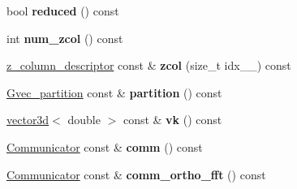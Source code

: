 \begin{DoxyCompactItemize}
\item 
\hypertarget{classsddk_1_1_gvec_a048cdcce9b4da07aa596975efbb40df4}{}bool {\bfseries reduced} () const \label{classsddk_1_1_gvec_a048cdcce9b4da07aa596975efbb40df4}

\item 
\hypertarget{classsddk_1_1_gvec_a6f97e7fe1de66856ebd718dbd453721f}{}int {\bfseries num\+\_\+zcol} () const \label{classsddk_1_1_gvec_a6f97e7fe1de66856ebd718dbd453721f}

\item 
\hypertarget{classsddk_1_1_gvec_a9350abf87e5f9da02f6b349df9ed9162}{}\hyperlink{structsddk_1_1z__column__descriptor}{z\+\_\+column\+\_\+descriptor} const \& {\bfseries zcol} (size\+\_\+t idx\+\_\+\+\_\+) const \label{classsddk_1_1_gvec_a9350abf87e5f9da02f6b349df9ed9162}

\item 
\hypertarget{classsddk_1_1_gvec_a6f48bfe39697d681ce2f3ee7cc72386c}{}\hyperlink{classsddk_1_1_gvec__partition}{Gvec\+\_\+partition} const \& {\bfseries partition} () const \label{classsddk_1_1_gvec_a6f48bfe39697d681ce2f3ee7cc72386c}

\item 
\hypertarget{classsddk_1_1_gvec_aabaf193d8c550e1d29e94e0d2389bb4d}{}\hyperlink{classgeometry3d_1_1vector3d}{vector3d}$<$ double $>$ const \& {\bfseries vk} () const \label{classsddk_1_1_gvec_aabaf193d8c550e1d29e94e0d2389bb4d}

\item 
\hypertarget{classsddk_1_1_gvec_a74fd52c1b5172156a8baa7223935a79a}{}\hyperlink{classsddk_1_1_communicator}{Communicator} const \& {\bfseries comm} () const \label{classsddk_1_1_gvec_a74fd52c1b5172156a8baa7223935a79a}

\item 
\hypertarget{classsddk_1_1_gvec_a7faf78fbd24241ce903f8cd88fdbc5ec}{}\hyperlink{classsddk_1_1_communicator}{Communicator} const \& {\bfseries comm\+\_\+ortho\+\_\+fft} () const \label{classsddk_1_1_gvec_a7faf78fbd24241ce903f8cd88fdbc5ec}

\end{DoxyCompactItemize}
